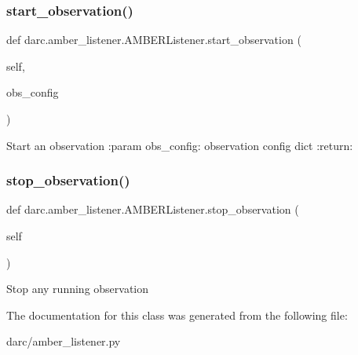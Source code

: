 \subsubsection{\texorpdfstring{start\_observation()}{start\_observation()}}
{\footnotesize\ttfamily def darc.\+amber\+\_\+listener.\+A\+M\+B\+E\+R\+Listener.\+start\+\_\+observation (\begin{DoxyParamCaption}\item[{}]{self,  }\item[{}]{obs\+\_\+config }\end{DoxyParamCaption})}

\begin{DoxyVerb}Start an observation
:param obs_config: observation config dict
:return:
\end{DoxyVerb}
 \mbox{\label{classdarc_1_1amber__listener_1_1_a_m_b_e_r_listener_a1f4eddb8601418ccb48057f3ae42dd0f}} 
\subsubsection{\texorpdfstring{stop\_observation()}{stop\_observation()}}
{\footnotesize\ttfamily def darc.\+amber\+\_\+listener.\+A\+M\+B\+E\+R\+Listener.\+stop\+\_\+observation (\begin{DoxyParamCaption}\item[{}]{self }\end{DoxyParamCaption})}

\begin{DoxyVerb}Stop any running observation
\end{DoxyVerb}
 

The documentation for this class was generated from the following file\+:\begin{DoxyCompactItemize}
\item 
darc/amber\+\_\+listener.\+py\end{DoxyCompactItemize}

